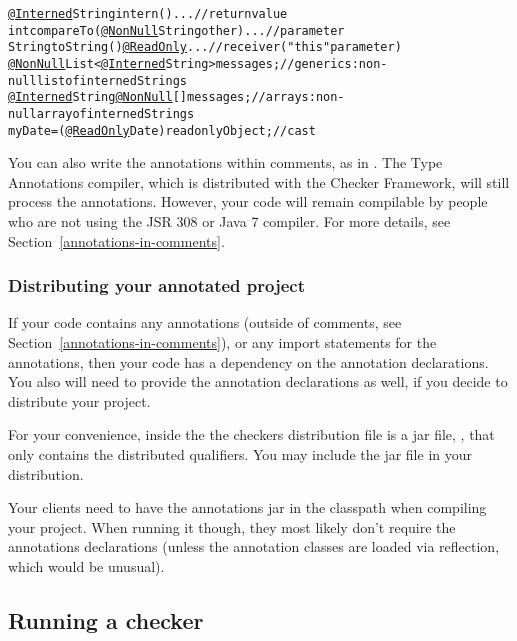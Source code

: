 \begin{alltt}
  \underline{@Interned} String intern() \ttlcb{} ... \ttrcb{}             // return value
  int compareTo(\underline{@NonNull} String other) \ttlcb{} ... \ttrcb{}  // parameter
  String toString() \underline{@ReadOnly} \ttlcb{} ... \ttrcb{}           // receiver ("this" parameter)
  \underline{@NonNull} List<\underline{@Interned} String> messages;     // generics:  non-null list of interned Strings
  \underline{@Interned} String \underline{@NonNull} [] messages;        // arrays:  non-null array of interned Strings
  myDate = (\underline{@ReadOnly} Date) readonlyObject;     // cast
\end{alltt}

You can also write the annotations within comments, as in
.  The Type Annotations compiler, which is
distributed with the Checker Framework, will still process
the annotations.
However, your code will remain compilable by people who are not using the JSR
308 or Java 7 compiler.  For more details, see
Section~\ref{annotations-in-comments}.



\subsubsection{Distributing your annotated project\label{distributing}}

If your code contains any annotations (outside of comments, see Section~\ref{annotations-in-comments}), or any import
statements for the annotations, then your code has a dependency on the
annotation declarations.  You also will need to provide the annotation
declarations as well, if you decide to distribute your project.

For your convenience, inside the the checkers distribution  file
is a jar file,
, that only contains the distributed qualifiers.
You may include the jar file in your distribution.

Your clients need to have the annotations jar in the classpath when
compiling your project.  When running it though, they most likely
don't require the annotations declarations (unless the annotation
classes are loaded via reflection, which would be unusual).


\subsection{Running a checker\label{running}}

